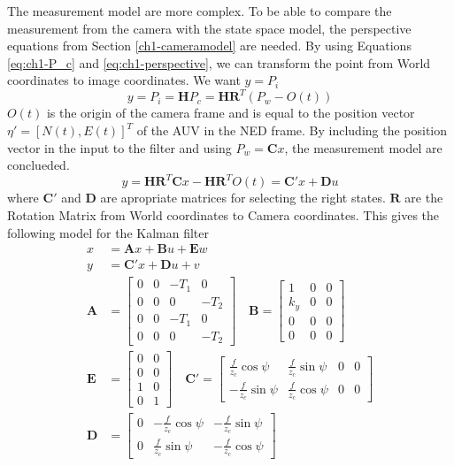 	The measurement model are more complex. To be able to compare the measurement from the camera with the
	state space model, the perspective equations from Section \ref{ch1-cameramodel} are needed. By using
	Equations \eqref{eq:ch1-P_c} and \eqref{eq:ch1-perspective}, we can transform the point from World
	coordinates to image coordinates. We want $y = P_i$
	\begin{equation*}
		y = P_i = \mathbf{H} P_c = \mathbf{H R}^T ( P_w - O(t))
	\end{equation*}
	$O(t)$ is the origin of the camera frame and is equal to the position vector $\eta' = [N(t),
	E(t)]^T$ of the AUV in the NED frame. By including the position vector in the input to the filter and using 
	$P_w = \mathbf{C} x$, the measurement model are conclueded.
	\begin{equation}
		\label{eq:ch2-measurement}
		y = \mathbf{H R}^T \mathbf{C} x - \mathbf{H R}^T  O(t) = \mathbf{C}'x + \mathbf{D} u
	\end{equation}
	where $\mathbf{C'}$ and $\mathbf{D}$ are apropriate matrices for selecting the right states. $\mathbf{R}$
	are the Rotation Matrix from World coordinates to Camera coordinates. This gives the following model
	for the Kalman filter
	\begin{align}
		x &= \mathbf{A} x + \mathbf{B} u + \mathbf{E} w\\
		y &= \mathbf{C}'x + \mathbf{D} u + v\\
		\mathbf{A} &= \left [ \begin{matrix}
					0 & 0 & -T_1 & 0 \\
					0 & 0 & 0 & -T_2 \\
					0 & 0 & -T_1 & 0 \\
					0 & 0 & 0 & -T_2 
					\end{matrix} \right] \quad \mathbf{B} = \left[ \begin{matrix}
										1 & 0 & 0 \\
										k_y & 0 & 0\\
										0   & 0 & 0 \\
										0 & 0 & 0
										\end{matrix} \right]\\
		\mathbf{E} &= \left [ \begin{matrix}
					0 & 0 \\
					0 & 0 \\
					1 & 0 \\
					0 & 1
					\end{matrix} \right] \quad \mathbf{C}' = \left [ \begin{matrix}
						\frac{f}{z_c} \cos{\psi} &\frac{f}{z_c} \sin{\psi} & 0 & 0 \\
						-\frac{f}{z_c} \sin{\psi}& \frac{f}{z_c} \cos{\psi} & 0 & 0 
								\end{matrix} \right] \\
		\mathbf{D} &= \left [ \begin{matrix}
					0 & -\frac{f}{z_c} \cos{\psi} & -\frac{f}{z_c} \sin{\psi} \\
					0 & \frac{f}{z_c} \sin{\psi} & -\frac{f}{z_c} \cos{\psi}
					\end{matrix} \right]
	\end{align}
